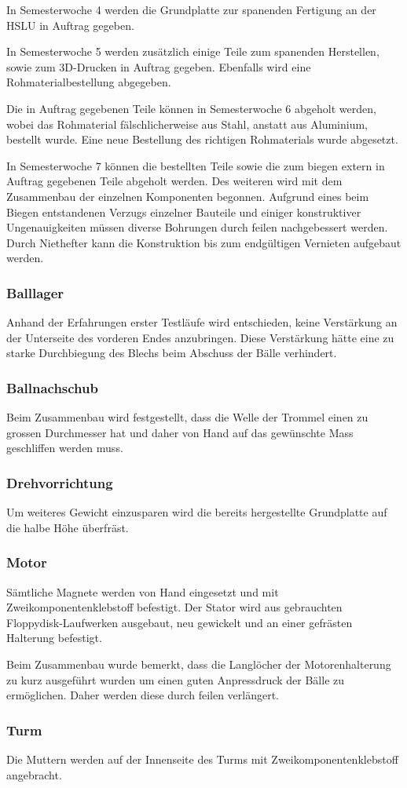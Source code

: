 In Semesterwoche 4 werden die Grundplatte zur spanenden Fertigung an der HSLU in Auftrag gegeben.

In Semesterwoche 5 werden zusätzlich einige Teile zum spanenden Herstellen, sowie zum 3D-Drucken in Auftrag gegeben. Ebenfalls wird eine Rohmaterialbestellung abgegeben.

Die in Auftrag gegebenen Teile können in Semesterwoche 6 abgeholt werden, wobei das  Rohmaterial fälschlicherweise aus Stahl, anstatt aus Aluminium, bestellt wurde. Eine neue Bestellung des richtigen Rohmaterials wurde abgesetzt.

In Semesterwoche 7 können die bestellten Teile sowie die zum biegen extern in Auftrag gegebenen Teile abgeholt werden. Des weiteren wird mit dem Zusammenbau der einzelnen Komponenten begonnen. Aufgrund eines beim Biegen entstandenen Verzugs einzelner Bauteile und einiger konstruktiver Ungenauigkeiten müssen diverse Bohrungen durch feilen nachgebessert werden. Durch Niethefter kann die Konstruktion bis zum endgültigen Vernieten aufgebaut werden.

\subsubsection{Balllager}
Anhand der Erfahrungen erster Testläufe wird entschieden, keine Verstärkung an der Unterseite des vorderen Endes anzubringen. Diese Verstärkung hätte eine zu starke Durchbiegung des Blechs beim Abschuss der Bälle verhindert.
\subsubsection{Ballnachschub}
Beim Zusammenbau wird festgestellt, dass die Welle der Trommel einen zu grossen Durchmesser hat und daher von Hand auf das gewünschte Mass geschliffen werden muss.
\subsubsection{Drehvorrichtung}
Um weiteres Gewicht einzusparen wird die bereits hergestellte Grundplatte auf die halbe Höhe überfräst.
\subsubsection{Motor}
Sämtliche Magnete werden von Hand eingesetzt und mit Zweikomponentenklebstoff befestigt. Der Stator wird aus gebrauchten Floppydisk-Laufwerken ausgebaut, neu gewickelt und an einer gefrästen Halterung befestigt.

Beim Zusammenbau wurde bemerkt, dass die Langlöcher der Motorenhalterung zu kurz ausgeführt wurden um einen guten Anpressdruck der Bälle zu ermöglichen. Daher werden diese durch feilen verlängert.

\subsubsection{Turm}
Die Muttern werden auf der Innenseite des Turms mit Zweikomponentenklebstoff angebracht.


